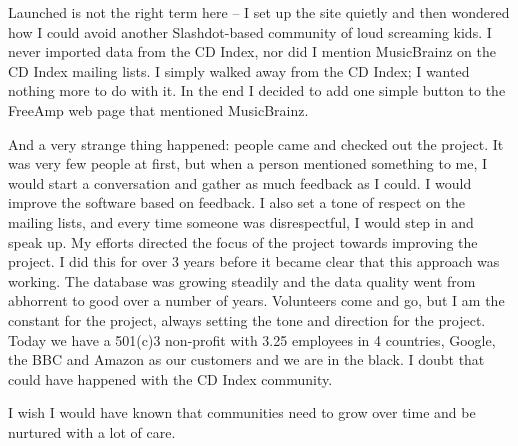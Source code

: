 Launched is not the right term here -- I set up the site quietly and then
wondered how I could avoid another Slashdot-based community of loud screaming
kids. I never imported data from the CD Index, nor did I mention MusicBrainz on
the CD Index mailing lists. I simply walked away from the CD Index; I wanted
nothing more to do with it. In the end I decided to add one simple button to the
FreeAmp web page that mentioned MusicBrainz.

And a very strange thing happened: people came and checked out the project. It
was very few people at first, but when a person mentioned something to me, I
would start a conversation and gather as much feedback as I could. I would
improve the software based on feedback. I also set a tone of respect on the
mailing lists, and every time someone was disrespectful, I would step in and
speak up. My efforts directed the focus of the project towards improving the
project. I did this for over 3 years before it became clear that this approach
was working. The database was growing steadily and the data quality went from
abhorrent to good over a number of years. Volunteers come and go, but I am the
constant for the project, always setting the tone and direction for the project.
Today we have a 501(c)3 non-profit with 3.25 employees in 4 countries, Google,
the BBC and Amazon as our customers and we are in the black. I doubt that could
have happened with the CD Index community.

I wish I would have known that communities need to grow over time and be
nurtured with a lot of care.
